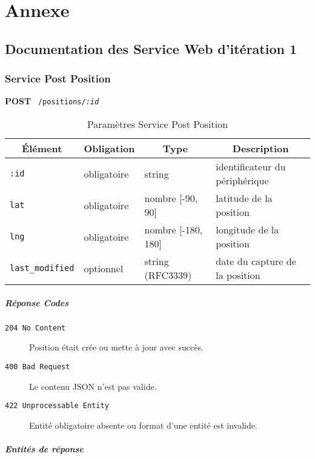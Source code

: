 \section{Annexe}
\pagebreak

\subsection{Documentation des Service Web d'itération 1}

\subsubsection{Service Post Position}
\label{appendix:sprint1-position-post-doc}

\textbf{POST} \ \texttt{/positions/\textit{:id}}

\begin{table}[htbp]
    \centering
    \caption*{Paramètres Service Post Position}
    \begin{tabular}{llll}
        \toprule
        \multicolumn{1}{c}{\textbf{Élément}} &
        \multicolumn{1}{c}{\textbf{Obligation}} &
        \multicolumn{1}{c}{\textbf{Type}} &
        \multicolumn{1}{c}{\textbf{Description}} \\
        \midrule
        \verb|:id| & obligatoire & string & identificateur du périphérique \\
        \verb|lat| & obligatoire & nombre [-90, 90] & latitude de la position \\
        \verb|lng| & obligatoire & nombre [-180, 180] & longitude de la position \\
        \verb|last_modified| & optionnel & string (RFC3339) & date du capture de la position \\
        \bottomrule
    \end{tabular}
\end{table}

\subparagraph*{Réponse Codes}
\begin{description}
    \item[\texttt{204 No Content}] Position était crée ou mette à jour avec succès.
    \item[\texttt{400 Bad Request}] Le contenu JSON n'est pas valide.
    \item[\texttt{422 Unprocessable Entity}] Entité obligatoire absente ou format d'une entité est invalide.
\end{description}

\subparagraph*{Entités de réponse}

